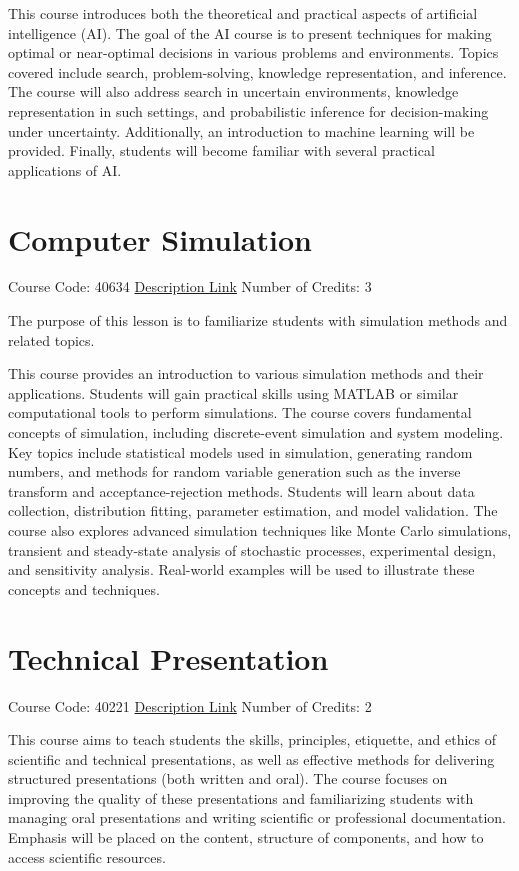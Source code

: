 This course introduces both the theoretical and practical aspects of artificial intelligence (AI). The goal of the AI course is to present techniques for making optimal or near-optimal decisions in various problems and environments. Topics covered include search, problem-solving, knowledge representation, and inference. The course will also address search in uncertain environments, knowledge representation in such settings, and probabilistic inference for decision-making under uncertainty. Additionally, an introduction to machine learning will be provided. Finally, students will become familiar with several practical applications of AI.

\section{Computer Simulation}
Course Code: 40634 \qquad \quad \href{https://docs.ce.sharif.edu/course/40634}{Description Link}
\qquad \quad Number of Credits: 3

The purpose of this lesson is to familiarize students with simulation methods and related topics.

This course provides an introduction to various simulation methods and their applications. Students will gain practical skills using MATLAB or similar computational tools to perform simulations. The course covers fundamental concepts of simulation, including discrete-event simulation and system modeling. Key topics include statistical models used in simulation, generating random numbers, and methods for random variable generation such as the inverse transform and acceptance-rejection methods. Students will learn about data collection, distribution fitting, parameter estimation, and model validation. The course also explores advanced simulation techniques like Monte Carlo simulations, transient and steady-state analysis of stochastic processes, experimental design, and sensitivity analysis. Real-world examples will be used to illustrate these concepts and techniques.


\section{Technical Presentation}
Course Code: 40221 \qquad \quad \href{https://docs.ce.sharif.edu/course/40221}{Description Link}
\qquad \quad Number of Credits: 2

This course aims to teach students the skills, principles, etiquette, and ethics of scientific and technical presentations, as well as effective methods for delivering structured presentations (both written and oral). The course focuses on improving the quality of these presentations and familiarizing students with managing oral presentations and writing scientific or professional documentation. Emphasis will be placed on the content, structure of components, and how to access scientific resources.

